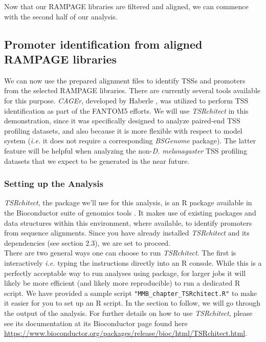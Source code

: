 \documentclass[runningheads,a4paper]{llncs}
\begin{document}
\begin{linenumbers}
Now that our RAMPAGE libraries are filtered and aligned, we can commence with the second half of our analysis.

\subsection{Promoter identification from aligned RAMPAGE libraries}

We can now use the prepared alignment files to identify TSSs and promoters from the selected RAMPAGE libraries.
There are currently several tools available for this purpose.
\textit{CAGEr}, developed by Haberle \cite{Haberle:6TVSLN3N}, was utilized to perform TSS identification as part of the FANTOM5 efforts.
We will use \textit{TSRchitect} in this demonstration, since it was specifically designed to analyze paired-end TSS profiling datasets, and also because it is more flexible with respect to model system (\textit{i.e.} it does not require a corresponding \textit{BSGenome} package).
The latter feature will be helpful when analyzing the non-\textit{D. melanagaster} TSS profiling datasets that we expect to be generated in the near future.

\subsubsection{Setting up the Analysis}
\textit{TSRchitect}, the package we'll use for this analysis, is an R package available in the Bioconductor suite of genomics tools \cite{Lawrence:2014gy}.
It makes use of existing packages and data structures within this environment, where available, to identify promoters from sequence alignments.
Since you have already installed \textit{TSRchitect} and its dependencies (see section 2.3), we are set to proceed.\\
There are two general ways one can choose to run \textit{TSRchitect}. 
The first is interactively \textit{i.e.} typing the instructions directly into an R console.
While this is a perfectly acceptable way to run analyses using package, for larger jobs it will likely be more efficient (and likely more reproducible) to run a dedicated R script.
We have provided a sample script \texttt{"MMB\_chapter\_TSRchitect.R"} to make it easier for you to set up an R script. 
In the section to follow, we will go through the output of the analysis. 
For further details on how to use \textit{TSRchitect}, please see its documentation at its Bioconductor page found here \url{https://www.bioconductor.org/packages/release/bioc/html/TSRchitect.html}.\\


\end{linenumbers}
\end{document}

